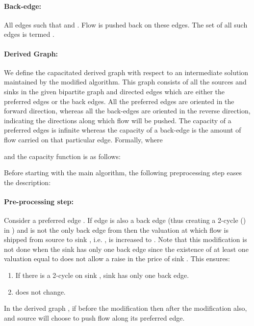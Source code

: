 \documentclass[11pt]{article}
\begin{document}
\paragraph*{Back-edge: }
All edges  such that  and .
Flow is pushed back on these edges.
The set of all such edges is termed .

\paragraph*{Derived Graph: }
We define the capacitated derived graph  with respect to an intermediate solution
maintained by the modified algorithm. This graph consists of all
the sources and sinks in the given bipartite graph and directed edges 
which are either the preferred edges or the back edges.
All the preferred edges are oriented in the forward direction, whereas 
all the back-edges are oriented in the reverse direction, indicating the
directions along which flow will be pushed. The capacity of a preferred edges
is infinite whereas the capacity of a back-edge is the amount of flow carried on
that particular edge. Formally,
  where 
 
and the capacity function 
is as follows:

 



Before starting with the main algorithm, 
the following  preprocessing step eases the description: 
\paragraph{Pre-processing step:}
Consider a preferred edge . If edge  is also a back edge (thus
creating a 2-cycle () in ) and 
is not the only back edge from  then 
the valuation  at which flow is shipped from source  to sink ,
i.e. ,  is increased to .
Note that this modification is not done when the sink has only
one back edge   since the existence of at least one valuation equal to
 does not allow a  raise  in the price of sink . 
This ensures:
\begin{enumerate}
\item
If there is a 2-cycle on sink , sink  has only
one back edge. 

\item
 does not change. 
\end{enumerate}
In the derived graph , if  before the modification then  
after the modification also,
and source  will choose to push flow along its preferred edge.
\end{document}
